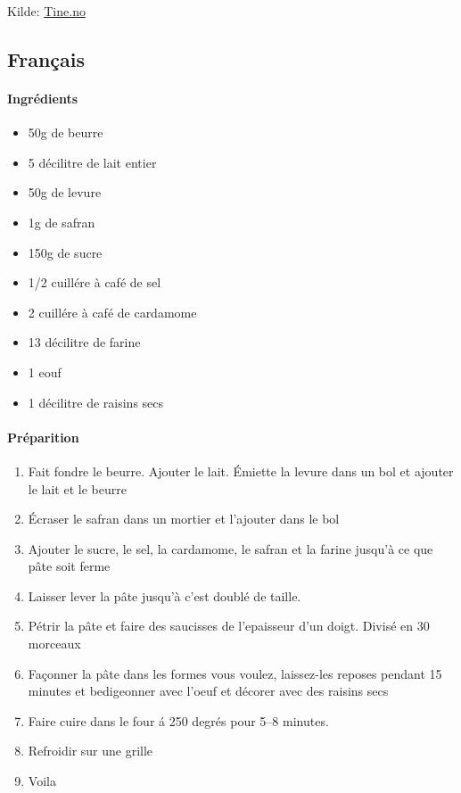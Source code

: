 Kilde: \href{Tine.no}{Tine.no}


\subsection{Français}
\paragraph{Ingrédients}
\begin{itemize}[noitemsep]
	\item 50g de beurre
	\item 5 décilitre de lait entier
	\item 50g de levure
	\item 1g de safran
	\item 150g de sucre
	\item 1/2 cuillére à café de sel
	\item 2 cuillére à café de cardamome
	\item 13 décilitre de farine
	\item 1 eouf
	\item 1 décilitre de raisins secs
\end{itemize}

\paragraph{Préparition}
\begin{enumerate}[noitemsep]
	\item Fait fondre le beurre. Ajouter le lait. Émiette la levure dans un bol et ajouter le lait et le beurre
	\item Écraser le safran dans un mortier et l'ajouter  dans le bol
	\item Ajouter le sucre, le sel, la cardamome, le safran et la farine jusqu'à ce que pâte soit ferme
	\item Laisser lever la pâte jusqu'à c'est doublé de taille.
	\item Pétrir la pâte et faire des saucisses de l'epaisseur d'un doigt. Divisé en 30 morceaux
	\item Façonner la pâte dans les formes vous voulez, laissez-les reposes pendant 15 minutes et bedigeonner avec l'oeuf et décorer avec des raisins secs
	\item Faire cuire dans le four á 250 degrés pour 5--8 minutes.
	\item Refroidir sur une grille
	\item Voila
\end{enumerate}



